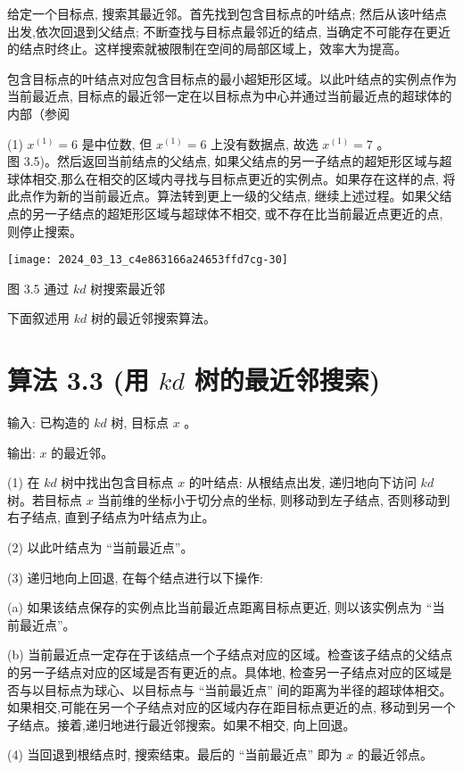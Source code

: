 \documentclass[10pt]{article}
\begin{document}
给定一个目标点, 搜索其最近邻。首先找到包含目标点的叶结点; 然后从该叶结点出发,依次回退到父结点; 不断查找与目标点最邻近的结点, 当确定不可能存在更近的结点时终止。这样搜索就被限制在空间的局部区域上，效率大为提高。

包含目标点的叶结点对应包含目标点的最小超矩形区域。以此叶结点的实例点作为当前最近点, 目标点的最近邻一定在以目标点为中心并通过当前最近点的超球体的内部（参阅

(1) $x^{(1)}=6$ 是中位数, 但 $x^{(1)}=6$ 上没有数据点, 故选 $x^{(1)}=7$ 。\\
图 3.5)。然后返回当前结点的父结点, 如果父结点的另一子结点的超矩形区域与超球体相交,那么在相交的区域内寻找与目标点更近的实例点。如果存在这样的点, 将此点作为新的当前最近点。算法转到更上一级的父结点, 继续上述过程。如果父结点的另一子结点的超矩形区域与超球体不相交, 或不存在比当前最近点更近的点, 则停止搜索。

\begin{center}
\texttt{[image: 2024\_03\_13\_c4e863166a24653ffd7cg-30]}
\end{center}

图 3.5 通过 $k d$ 树搜索最近邻

下面叙述用 $k d$ 树的最近邻搜索算法。

\section*{算法 3.3 (用 $k d$ 树的最近邻搜索)}
输入: 已构造的 $k d$ 树, 目标点 $x$ 。

输出: $x$ 的最近邻。

(1) 在 $k d$ 树中找出包含目标点 $x$ 的叶结点: 从根结点出发, 递归地向下访问 $k d$ 树。若目标点 $x$ 当前维的坐标小于切分点的坐标, 则移动到左子结点, 否则移动到右子结点, 直到子结点为叶结点为止。

(2) 以此叶结点为 “当前最近点”。

(3) 递归地向上回退, 在每个结点进行以下操作:

(a) 如果该结点保存的实例点比当前最近点距离目标点更近, 则以该实例点为 “当前最近点”。

(b) 当前最近点一定存在于该结点一个子结点对应的区域。检查该子结点的父结点的另一子结点对应的区域是否有更近的点。具体地, 检查另一子结点对应的区域是否与以目标点为球心、以目标点与 “当前最近点” 间的距离为半径的超球体相交。如果相交,可能在另一个子结点对应的区域内存在距目标点更近的点, 移动到另一个子结点。接着,递归地进行最近邻搜索。如果不相交, 向上回退。

(4) 当回退到根结点时, 搜索结束。最后的 “当前最近点” 即为 $x$ 的最近邻点。
\end{document}
